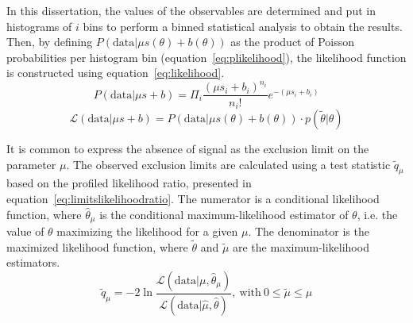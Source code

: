 In this dissertation, the values of the observables are determined and put in histograms of $i$ bins to perform a binned statistical analysis to obtain the results. Then, by defining $P(\mathrm{data}|\mu s(\theta)+b(\theta) )$ as the product of Poisson probabilities per histogram bin (equation~\ref{eq:plikelihood}), the likelihood function is constructed using  equation~\ref{eq:likelihood}.
\begin{equation} \label{eq:plikelihood}
 P(\mathrm{data}|\mu s+b ) = \Pi_{i} \frac{(\mu s_{i} + b_{i})^{n_{i}}} {n_{i}!}  e^{-(\mu s_{i} + b_{i})}
\end{equation}
\begin{equation} \label{eq:likelihood}
    \mathcal{L}(\mathrm{data}|\mu s+b) = P(\mathrm{data}|\mu s(\theta)+b(\theta) ) \cdot p( \tilde{\theta} |\theta)
\end{equation}

It is common to express the absence of signal as the exclusion limit on the parameter $\mu$. The observed exclusion limits are calculated using a test statistic $\tilde{q}_{\mu}$ based on the profiled likelihood ratio, presented in   equation~\ref{eq:limitslikelihoodratio}. The numerator is a conditional likelihood function, where $\hat{\theta}_{\mu}$ is the conditional maximum-likelihood estimator of $\theta$, i.e. the value of $\theta$ maximizing the likelihood for a given $\mu$. The denominator is the maximized likelihood function, where $\tilde{\theta}$ and $\tilde{\mu}$ are the maximum-likelihood estimators.
\begin{equation} \label{eq:limitslikelihoodratio}
\tilde{q}_{\mu}= -2 \ln \frac{ \mathcal{L}(\mathrm{data}|\mu, \hat{\theta}_{\mu}) }{ \mathcal{L}(\mathrm{data}| \hat{\mu}, \hat{\theta})} \mathrm{,~ with}~0 \leq \tilde{\mu} \leq \mu 
\end{equation}


